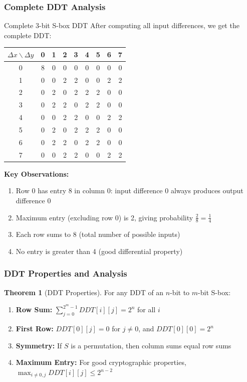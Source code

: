 \documentclass[12pt,a4paper]{article}
\theoremstyle{definition}
\newtheorem{theorem}{Theorem}[section]
\newcommand{\diff}{\Delta}
\begin{document}
\subsubsection{Complete DDT Analysis}

\begin{examplebox}{Complete 3-bit S-box DDT}
After computing all input differences, we get the complete DDT:

\begin{center}
\begin{tabular}{c|cccccccc}
$\diff x \backslash \diff y$ & 0 & 1 & 2 & 3 & 4 & 5 & 6 & 7 \\
\hline
0 & 8 & 0 & 0 & 0 & 0 & 0 & 0 & 0 \\
1 & 0 & 0 & 2 & 2 & 0 & 0 & 2 & 2 \\
2 & 0 & 2 & 0 & 2 & 2 & 2 & 0 & 0 \\
3 & 0 & 2 & 2 & 0 & 2 & 2 & 0 & 0 \\
4 & 0 & 0 & 2 & 2 & 0 & 0 & 2 & 2 \\
5 & 0 & 2 & 0 & 2 & 2 & 2 & 0 & 0 \\
6 & 0 & 2 & 2 & 0 & 2 & 2 & 0 & 0 \\
7 & 0 & 0 & 2 & 2 & 0 & 0 & 2 & 2 \\
\end{tabular}
\end{center}

\textbf{Key Observations:}
\begin{enumerate}
    \item Row 0 has entry 8 in column 0: input difference 0 always produces output difference 0
    \item Maximum entry (excluding row 0) is 2, giving probability $\frac{2}{8} = \frac{1}{4}$
    \item Each row sums to 8 (total number of possible inputs)
    \item No entry is greater than 4 (good differential property)
\end{enumerate}
\end{examplebox}

\subsubsection{DDT Properties and Analysis}

\begin{theorem}[DDT Properties]
For any DDT of an $n$-bit to $m$-bit S-box:
\begin{enumerate}
    \item \textbf{Row Sum:} $\sum_{j=0}^{2^m-1} DDT[i][j] = 2^n$ for all $i$
    \item \textbf{First Row:} $DDT[0][j] = 0$ for $j \neq 0$, and $DDT[0][0] = 2^n$
    \item \textbf{Symmetry:} If $S$ is a permutation, then column sums equal row sums
    \item \textbf{Maximum Entry:} For good cryptographic properties, $\max_{i \neq 0, j} DDT[i][j] \leq 2^{n-2}$
\end{enumerate}
\end{theorem}
\end{document}
